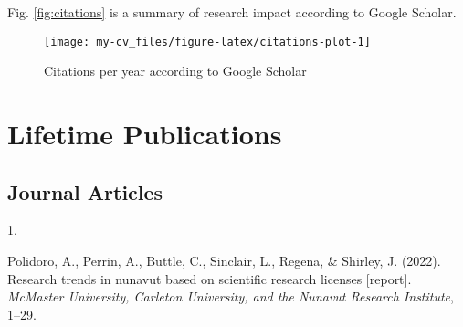 \documentclass[11pt,a4paper,]{awesome-cv}
\newlength{\csllabelwidth}
\newcommand{\CSLLeftMargin}[1]{\parbox[t]{\csllabelwidth}{#1}}
\newcommand{\CSLRightInline}[1]{\parbox[t]{\linewidth - \csllabelwidth}{#1}}
\begin{document}
Fig. \ref{fig:citations} is a summary of research impact according to
Google Scholar.

\begin{figure}

{\centering \texttt{[image: my-cv\_files/figure-latex/citations-plot-1]} 

}

\caption{\label{fig:citations}Citations per year according to Google Scholar}\label{fig:citations-plot}
\end{figure}

\hypertarget{lifetime-publications}{%
\section{Lifetime Publications}\label{lifetime-publications}}

\hypertarget{journal-articles}{%
\subsection{Journal Articles}\label{journal-articles}}

\hypertarget{bibliography}{}
\leavevmode{}%
\CSLLeftMargin{1. }
\CSLRightInline{Polidoro, A., Perrin, A., Buttle, C., Sinclair, L.,
Regena, \& Shirley, J. (2022). Research trends in nunavut based on
scientific research licenses {[}report{]}. \emph{McMaster University,
Carleton University, and the Nunavut Research Institute}, 1--29.}


\label{LastPage}~
\end{document}
